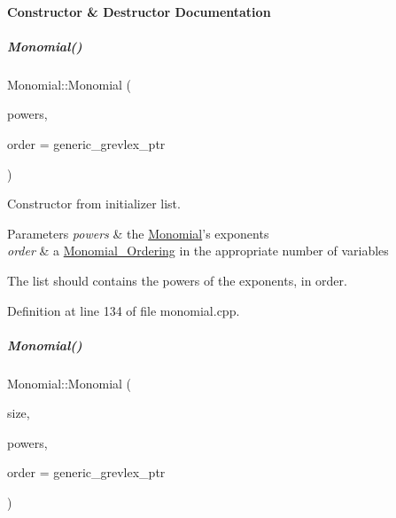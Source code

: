 \paragraph{Constructor \& Destructor Documentation}
\mbox{\label{group__polygroup_a8b9c7bc9d5b286adb11ccc39471b00c4}} 
\subparagraph{\texorpdfstring{Monomial()}{Monomial()}\hspace{0.1cm}{\footnotesize\ttfamily [1/2]}}
{\footnotesize\ttfamily Monomial\+::\+Monomial (\begin{DoxyParamCaption}\item[{initializer\+\_\+list$<$ E\+X\+P\+\_\+\+T\+Y\+PE $>$}]{powers,  }\item[{const \hyperlink{group__orderinggroup_class_monomial___ordering}{Monomial\+\_\+\+Ordering} $\ast$}]{order = {\ttfamily generic\+\_\+grevlex\+\_\+ptr} }\end{DoxyParamCaption})}



Constructor from initializer list. 


\begin{DoxyParams}{Parameters}
{\em powers} & the \hyperlink{group__polygroup_class_monomial}{Monomial}'s exponents \\
\hline
{\em order} & a \hyperlink{group__orderinggroup_class_monomial___ordering}{Monomial\+\_\+\+Ordering} in the appropriate number of variables\\
\hline
\end{DoxyParams}
The list should contains the powers of the exponents, in order. 

Definition at line 134 of file monomial.\+cpp.

\mbox{\label{group__polygroup_a85d91b1a13592c849394c26c5ad294d8}} 
\subparagraph{\texorpdfstring{Monomial()}{Monomial()}\hspace{0.1cm}{\footnotesize\ttfamily [2/2]}}
{\footnotesize\ttfamily Monomial\+::\+Monomial (\begin{DoxyParamCaption}\item[{N\+V\+A\+R\+\_\+\+T\+Y\+PE}]{size,  }\item[{const E\+X\+P\+\_\+\+T\+Y\+PE $\ast$}]{powers,  }\item[{const \hyperlink{group__orderinggroup_class_monomial___ordering}{Monomial\+\_\+\+Ordering} $\ast$}]{order = {\ttfamily generic\+\_\+grevlex\+\_\+ptr} }\end{DoxyParamCaption})}



